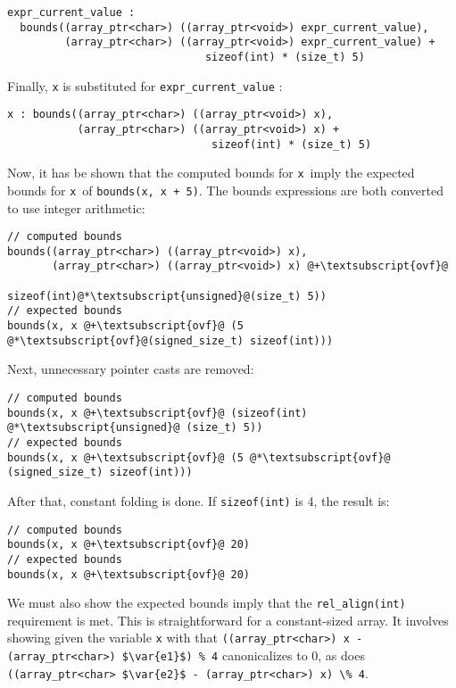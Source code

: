 \begin{lstlisting}
expr_current_value :
  bounds((array_ptr<char>) ((array_ptr<void>) expr_current_value),
         (array_ptr<char>) ((array_ptr<void>) expr_current_value) +
                               sizeof(int) * (size_t) 5)
\end{lstlisting}

Finally, \lstinline|x| is substituted for \lstinline|expr_current_value| :

\begin{lstlisting}
x : bounds((array_ptr<char>) ((array_ptr<void>) x), 
           (array_ptr<char>) ((array_ptr<void>) x) +
                                sizeof(int) * (size_t) 5)
\end{lstlisting}

Now, it has be shown that the computed bounds for \lstinline|x|\ imply the expected
bounds for \lstinline|x|\ of \lstinline|bounds(x, x + 5)|. The bounds expressions are both
converted to use integer arithmetic:

\begin{lstlisting}[escapechar=\@]
// computed bounds
bounds((array_ptr<char>) ((array_ptr<void>) x),
       (array_ptr<char>) ((array_ptr<void>) x) @+\textsubscript{ovf}@
                             sizeof(int)@*\textsubscript{unsigned}@(size_t) 5))
// expected bounds
bounds(x, x @+\textsubscript{ovf}@ (5 @*\textsubscript{ovf}@(signed_size_t) sizeof(int)))
\end{lstlisting}

Next, unnecessary pointer casts are removed:
\begin{lstlisting}[escapechar=\@]
// computed bounds
bounds(x, x @+\textsubscript{ovf}@ (sizeof(int) @*\textsubscript{unsigned}@ (size_t) 5))
// expected bounds
bounds(x, x @+\textsubscript{ovf}@ (5 @*\textsubscript{ovf}@ (signed_size_t) sizeof(int)))
\end{lstlisting}

After that, constant folding is done. If \lstinline+sizeof(int)+ is 4, the result is:
\begin{lstlisting}[escapechar=\@]
// computed bounds
bounds(x, x @+\textsubscript{ovf}@ 20)
// expected bounds
bounds(x, x @+\textsubscript{ovf}@ 20)
\end{lstlisting}

We must also show the expected bounds imply that the 
\lstinline|rel_align(int)| requirement is met. This is straightforward for
a constant-sized array. It involves showing given the variable \lstinline+x+ with
 that
\lstinline[mathescape]|((array_ptr<char>) x - (array_ptr<char>) $\var{e1}$) % 4| canonicalizes
to 0, as does \lstinline[mathescape]|((array_ptr<char> $\var{e2}$ - (array_ptr<char>) x) \% 4|.


